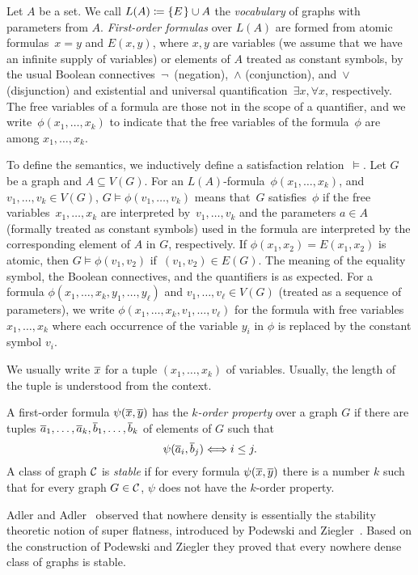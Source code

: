 Let $A$ be a set. We call $L(A)\coloneqq\{E\hspace{0.3mm}\}\cup A$ the \emph{vocabulary}
of graphs with parameters from $A$. \emph{First-order formulas} over $L(A)$ are
formed from atomic formulas~$x=y$ and $E(x,y)$, where $x,y$ are variables (we
assume that we have an infinite supply of variables) or elements of $A$ treated
as constant symbols, by the usual Boolean
connectives~$\neg$~(negation),~$\wedge$ (conjunction), and~$\vee$ (disjunction)
and existential and universal quantification~$\exists x,\forall x$,
respectively.  The free variables of a formula are those not in the scope of a
quantifier, and we write~$\phi(x_1,\ldots,x_k)$ to indicate that the free
variables of the formula~$\phi$ are among $x_1,\ldots,x_k$.

To define the semantics, we inductively define a satisfaction
relation~$\models$. Let $G$ be a graph and $A\subseteq V(G)$. For an
$L(A)$-formula~$\phi(x_1,\ldots,x_k)$, and
$v_1,\ldots,v_k\in V(G)$, $G\models\phi(v_1,\ldots,v_k)$
means that~$G$ satisfies~$\phi$ if the free variables~$x_1,\ldots,x_k$
are interpreted by~$v_1,\ldots,v_k$ and the parameters $a\in A$
(formally treated as constant symbols) used in the formula are
interpreted by the corresponding element of $A$ in $G$, respectively. If
$\phi(x_1,x_2)=E(x_1,x_2)$ is atomic, then $G\models\phi(v_1,v_2)$
if~$(v_1,v_2)\in E(G)$. The meaning of the equality symbol, the
Boolean connectives, and the quantifiers is as expected. For a
formula $\phi(x_1,\ldots, x_k, y_1,\ldots, y_\ell)$ and
$v_1,\ldots, v_\ell\in V(G)$ (treated as a sequence of parameters), we
write $\phi(x_1,\ldots, x_k, v_1,\ldots, v_\ell)$ for the formula with
free variables $x_1,\ldots, x_k$ where each occurrence of the variable
$y_i$ in $\phi$ is replaced by the constant symbol $v_i$.

We usually write $\overline{x}$ for a tuple $(x_1,\ldots, x_k)$ of variables. 
Usually, the length of the tuple is understood from the context. 

A first-order formula $\psi(\overline{x},\overline{y})$ has the \emph{$k$-order property}
over a graph $G$ if there are tuples $\overline{a}_1,\ldots, \overline{a}_k, \overline{b}_1,\ldots, \overline{b}_k$
of elements of $G$ such that \[\psi(\overline{a}_i,\overline{b}_j)\Longleftrightarrow i\leq j.\]
A class of graph $\mathcal{C}$ is \emph{stable} if for every formula $\psi(\overline{x},\overline{y})$ there
is a number $k$ such that for every graph $G\in \mathcal{C}$, $\psi$ does not have the $k$-order 
property.

Adler and Adler~\cite{adler2014interpreting} observed that nowhere density 
is essentially the stability theoretic notion of super flatness, introduced by
Podewski and Ziegler~\cite{podewski1978stable}. Based on the construction of 
Podewski and Ziegler they proved that every nowhere dense class of graphs is
stable. 

